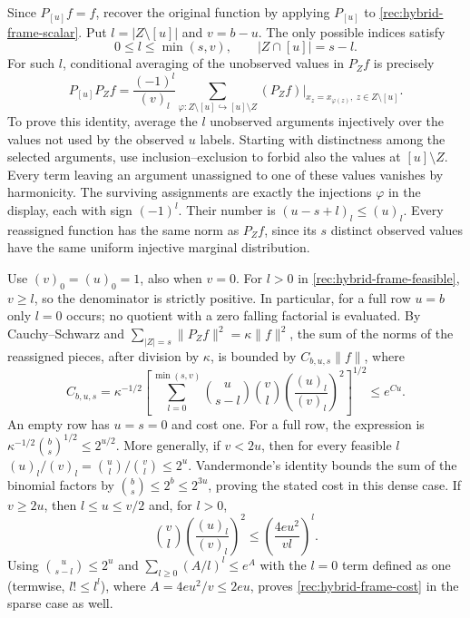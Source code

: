 Since $P_{[u]}f=f$, recover the original function by applying
$P_{[u]}$ to \eqref{rec:hybrid-frame-scalar}.  Put
$l=|Z\setminus[u]|$ and $v=b-u$.  The only possible indices satisfy
\begin{equation}\label{rec:hybrid-frame-feasible}
 0\le l\le\min(s,v),\qquad |Z\cap[u]|=s-l.
\end{equation}
For such $l$, conditional averaging of the unobserved values in
$P_Zf$ is precisely
\begin{equation}\label{rec:hybrid-frame-reassignment}
 P_{[u]}P_Zf
 =\frac{(-1)^l}{(v)_l}
 \sum_{\varphi:Z\setminus[u]\hookrightarrow[u]\setminus Z}
          (P_Zf)\big|_{x_z=x_{\varphi(z)},\ z\in Z\setminus[u]}.
\end{equation}
To prove this identity, average the $l$ unobserved arguments
injectively over the values not used by the observed $u$ labels.
Starting with distinctness among the selected arguments, use
inclusion--exclusion to forbid also the values at $[u]\setminus Z$.
Every term leaving an argument unassigned to one of these values
vanishes by harmonicity.  The surviving assignments are exactly the
injections $\varphi$ in the display, each with sign $(-1)^l$.
Their number is $(u-s+l)_l\le(u)_l$.  Every reassigned function
has the same norm as $P_Zf$, since its $s$ distinct observed values
have the same uniform injective marginal distribution.

Use $(v)_0=(u)_0=1$, also when $v=0$.  For $l>0$ in
\eqref{rec:hybrid-frame-feasible}, $v\ge l$, so the denominator
is strictly positive.  In particular, for a full row $u=b$ only
$l=0$ occurs; no quotient with a zero falling factorial is evaluated.
By Cauchy--Schwarz and
$\sum_{|Z|=s}\|P_Zf\|^2=\kappa\|f\|^2$, the sum of the norms
of the reassigned pieces, after division by $\kappa$, is bounded by
$C_{b,u,s}\|f\|$, where
\begin{equation}\label{rec:hybrid-frame-cost}
 C_{b,u,s}=\kappa^{-1/2}
 \left[\sum_{l=0}^{\min(s,v)}
      \binom u{s-l}\binom vl
      \left(\frac{(u)_l}{(v)_l}\right)^2\right]^{1/2}
 \le e^{Cu}.
\end{equation}
An empty row has $u=s=0$ and cost one.  For a full row, the expression
is $\kappa^{-1/2}\binom bs^{1/2}\le2^{u/2}$.
More generally, if $v<2u$, then for every feasible $l$
$ (u)_l/(v)_l=\binom ul/\binom vl\le2^u$.
Vandermonde's identity bounds the sum of the binomial factors by
$\binom bs\le2^b\le2^{3u}$, proving the stated cost in this
dense case.  If $v\ge2u$, then $l\le u\le v/2$ and, for $l>0$,
\[
 \binom vl\left(\frac{(u)_l}{(v)_l}\right)^2
       \le\left(\frac{4e u^2}{vl}\right)^l.
\]
Using $\binom u{s-l}\le2^u$ and
$\sum_{l\ge0}(A/l)^l\le e^A$ with the $l=0$ term defined as
one (termwise, $l!\le l^l$), where $A=4eu^2/v\le2eu$,
proves \eqref{rec:hybrid-frame-cost} in the sparse case as well.

